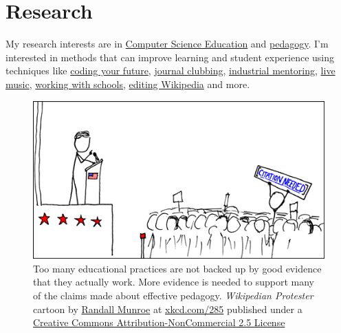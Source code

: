 \documentclass[
  12pt,
]{book}
\begin{document}
\hypertarget{research}{%
\chapter{Research}\label{research}}

My research interests are in \href{https://en.wikipedia.org/wiki/Computer_science_education}{Computer Science Education} and \href{https://en.wikipedia.org/wiki/Pedagogy}{pedagogy}. \citep{CERhandbook, JohnBiggs2011, Fry2014} I'm interested in methods that can improve learning and student experience using techniques like \href{https://www.cdyf.me}{coding your future}, \href{https://sigcse.cs.manchester.ac.uk/}{journal clubbing}, \href{https://www.cs.manchester.ac.uk/connect/business-engagement/industrial-mentoring/}{industrial mentoring}, \protect\hyperlink{tuningcomplete}{live music}, \href{https://personalpages.manchester.ac.uk/staff/duncan.hull/coding-their-future.html}{working with schools}, \protect\hyperlink{wikipedia}{editing Wikipedia} and more.

\begin{figure}

{\centering \includegraphics[width=0.99\linewidth]{images/wikipedian_protester} 

}

\caption{Too many educational practices are not backed up by good evidence that they actually work. More evidence is needed to support many of the claims made about effective pedagogy. \emph{Wikipedian Protester} cartoon by \href{https://en.wikipedia.org/wiki/Randall_Munroe}{Randall Munroe} at \href{https://xkcd.com/285/}{xkcd.com/285} published under a \href{https://creativecommons.org/licenses/by-nc/2.5/}{Creative Commons Attribution-NonCommercial 2.5 License}}\label{fig:unnamed-chunk-4}
\end{figure}
\end{document}
